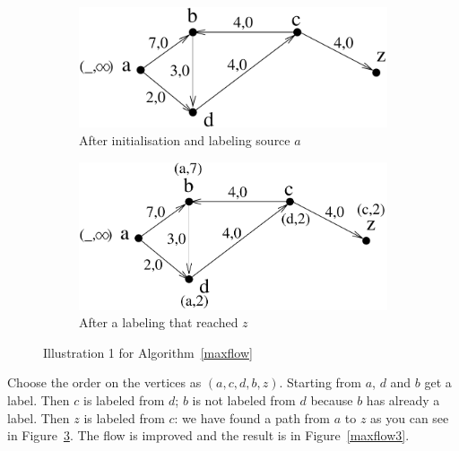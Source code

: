 \begin{figure}[ht]
	\centering
	\begin{subfigure}{0.45\linewidth}
		\centering
		\includegraphics[width=0.9\linewidth,keepaspectratio]{maxflow1}
		\caption{After initialisation and labeling source $a$}
		\label{maxflow1}
	\end{subfigure}\qquad\quad
	\begin{subfigure}{0.45\linewidth}
		\centering
		\includegraphics[width=0.9\linewidth,keepaspectratio]{maxflow2}
		\caption{After a labeling that reached $z$}
		\label{maxflow2}
	\end{subfigure}
	\caption{Illustration 1 for Algorithm~\ref{maxflow}}
\end{figure}

Choose the order on the vertices as $(a,c,d,b,z)$. Starting from $a$,
$d$ and $b$ get a label. Then $c$ is labeled from $d$; $b$ is not
labeled from $d$ because $b$ has already a label. Then $z$ is labeled
from $c$: we have found a path from $a$ to $z$ as you can see in
Figure~\ref{maxflow2}. The flow is improved and the result is in
Figure~\ref{maxflow3}.

